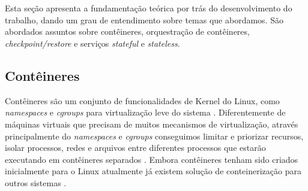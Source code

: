 

\chapter{} \label{cap:fundamentacao:teorica}

Esta seção apresenta a fundamentação teórica por trás do desenvolvimento
do trabalho, dando um grau de entendimento sobre temas que abordamos. São
abordados assuntos sobre contêineres, orquestração de contêineres,
\textit{checkpoint/restore} e serviços \textit{stateful} e \textit{stateless}.

\section{Contêineres}

Contêineres são um conjunto de funcionalidades de Kernel do Linux, como
\textit{namespaces} e \textit{cgroups} \cite{laadan2010linux} para virtualização
leve do sistema \cite{Chen2015/10} \cite{kubernetes}. Diferentemente de máquinas
virtuais que precisam de muitos mecanismos de virtualização, através principalmente
do \textit{namespaces} e \textit{cgroups} conseguimos limitar e priorizar recursos,
isolar processos, redes e arquivos entre diferentes processos que estarão executando
em contêineres separados \cite{kubernetes}. Embora contêineres tenham sido criados
inicialmente para o Linux atualmente já existem solução de conteinerização para
outros sistemas \cite{laadan2010linux}.

